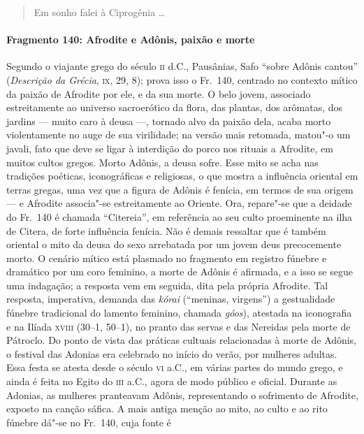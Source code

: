 \begin{verse}
Em sonho falei à Ciprogênia \ldots{}
\end{verse}

\paragraph{Fragmento 140: Afrodite e Adônis, paixão e morte}

{\small Segundo o viajante grego do século \textsc{ii} d.C., Pausânias, Safo “sobre
Adônis cantou” (\textit{Descrição da Grécia}, \textsc{ix}, 29, 8); prova isso o Fr.~140, 
centrado no contexto mítico da paixão de Afrodite por ele, e da sua morte.
O belo jovem, associado estreitamente ao universo sacroerótico da
flora, das plantas, dos arômatas, dos jardins --- muito caro à deusa ---,
tornado alvo da paixão dela, acaba morto violentamente no auge de sua
virilidade; na versão mais retomada, matou"-o um javali, fato que deve se ligar
à interdição do porco nos rituais a Afrodite, em muitos cultos gregos. Morto
Adônis, a deusa sofre. Esse mito se acha nas tradições poéticas, iconográficas
e religiosas, o que mostra a influência oriental em terras gregas, uma vez que
a figura de Adônis é fenícia, em termos de sua origem --- e Afrodite associa"-se
estreitamente ao Oriente. Ora, repare"-se que a deidade do Fr.~140 é chamada
``Citereia”, em referência ao seu culto proeminente na ilha de Citera,
de forte influência fenícia. Não é demais ressaltar que é também oriental o
mito da deusa do sexo arrebatada por um jovem deus precocemente morto. O
cenário mítico está plasmado no fragmento em registro fúnebre e dramático por um coro feminino, a morte de Adônis é afirmada, e a isso
se segue uma indagação; a resposta vem em seguida, dita pela própria Afrodite.
Tal resposta, imperativa, demanda das \textit{kórai} (``meninas, virgens'') a gestualidade fúnebre tradicional do lamento feminino, chamada \textit{góos}), atestada na iconografia e na Ilíada \textsc{xviii} (30--1, 50--1), no pranto das servas e das Nereidas pela morte de Pátroclo. Do ponto de vista das práticas cultuais relacionadas à morte de Adônis, o festival das Adonias 
era celebrado no início do verão, por mulheres adultas. Essa festa se atesta 
desde o século \textsc{vi} a.C., em várias partes do
mundo grego, e ainda é feita no Egito do \textsc{iii} a.C., agora de modo público e
oficial. Durante as Adonias, as mulheres pranteavam Adônis, representando o
sofrimento de Afrodite, exposto na canção sáfica. A mais antiga
menção ao mito, ao culto e ao rito fúnebre dá"-se no Fr.~140, cuja fonte é
}

